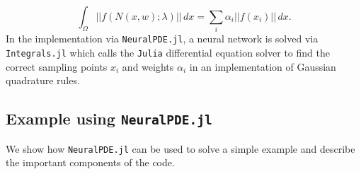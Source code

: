 \documentclass{CUP-JNL-DTM}%
\theoremstyle{definition}
\numberwithin{equation}{section}
\newcommand{\Julia}{\texttt{Julia} }
\begin{document}
\begin{equation}
	\int_{\Omega} ||f(N(x,w); \lambda)||\,dx = \sum_i \alpha_i ||f(x_i)||\,dx.
\end{equation}
In the implementation via \texttt{NeuralPDE.jl}, a neural network is solved via \texttt{Integrals.jl} which calls the \Julia differential equation solver \cite{rackauckasDifferentialEquationsJlPerformant2017} to find the correct sampling points $x_i$ and weights $\alpha_i$ in an implementation of Gaussian quadrature rules. 

\subsection{Example using \texttt{NeuralPDE.jl}}

We show how \texttt{NeuralPDE.jl} can be used to solve a simple example and describe the important components of the code. 
\end{document}
